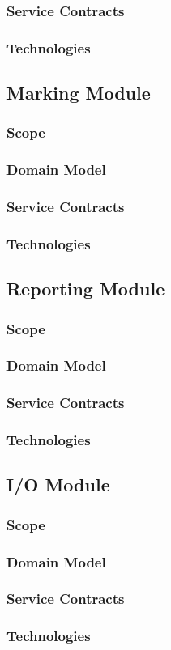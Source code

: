 \documentclass{article}
\begin{document}
		\subsubsection{Service Contracts}
		\subsubsection{Technologies}

	\subsection{Marking Module}
		\subsubsection{Scope}
		\subsubsection{Domain Model}
		\subsubsection{Service Contracts}
		\subsubsection{Technologies}
		
	\subsection{Reporting Module}
		\subsubsection{Scope}
		\subsubsection{Domain Model}
		\subsubsection{Service Contracts}
		\subsubsection{Technologies}
		
	\subsection{I/O Module}
		\subsubsection{Scope}
		\subsubsection{Domain Model}
		\subsubsection{Service Contracts}
		\subsubsection{Technologies}
		
\end{document}
